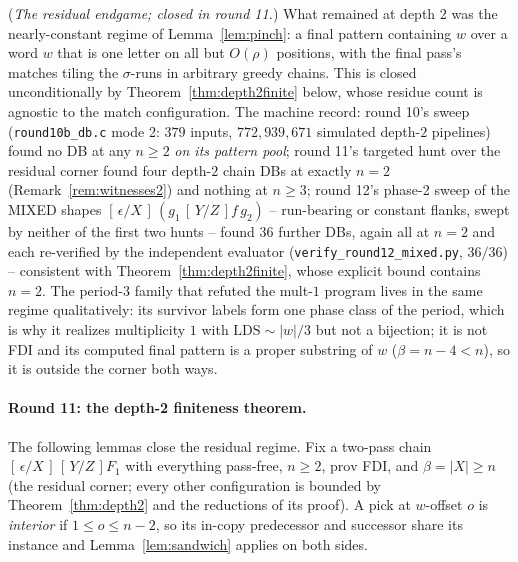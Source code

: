 \begin{remark}
    \label{rem:residual}
    (\emph{The residual endgame; closed in round 11.})  What remained
    at depth $2$ was the nearly-constant regime of
    Lemma~\ref{lem:pinch}: a final pattern containing $w$ over a word
    $w$ that is one letter on all but $O(\rho)$ positions, with the
    final pass's matches tiling the $\sigma$-runs in arbitrary greedy
    chains.  This is closed unconditionally by
    Theorem~\ref{thm:depth2finite} below, whose residue count is
    agnostic to the match configuration.  The machine record:
    round 10's sweep (\texttt{round10b\_db.c} mode 2: $379$ inputs,
    $772{,}939{,}671$ simulated depth-$2$ pipelines) found no DB at
    any $n \geq 2$ \emph{on its pattern pool}; round 11's targeted
    hunt over the residual corner found four depth-$2$ chain DBs at
    exactly $n = 2$ (Remark~\ref{rem:witnesses2}) and nothing at
    $n \geq 3$; round 12's phase-2 sweep of the MIXED shapes
    $[\,\epsilon/X\,]\,(g_1\,[\,Y/Z\,]f\,g_2)$ -- run-bearing or
    constant flanks, swept by neither of the first two hunts --
    found $36$ further DBs, again all at $n = 2$ and each re-verified
    by the independent evaluator (\texttt{verify\_round12\_mixed.py},
    $36/36$) -- consistent with Theorem~\ref{thm:depth2finite},
    whose explicit bound contains $n = 2$.  The period-$3$ family
    that refuted the mult-$1$ program lives in the same regime
    qualitatively: its survivor labels form one phase class of the
    period, which is why it realizes multiplicity $1$ with
    $\mathrm{LDS} \sim |w|/3$ but not a bijection; it is not FDI
    and its computed final pattern is a proper substring of $w$
    ($\beta = n - 4 < n$), so it is outside the corner both ways.
\end{remark}

\paragraph{Round 11: the depth-2 finiteness theorem.}
The following lemmas close the residual regime.  Fix a two-pass chain
$[\,\epsilon/X\,]\,[\,Y/Z\,]F_1$ with everything pass-free, $n \geq 2$,
$\mathrm{prov}$ FDI, and $\beta = |X| \geq n$ (the residual corner;
every other configuration is bounded by
Theorem~\ref{thm:depth2} and the reductions of its proof).  A pick at
$w$-offset $o$ is \emph{interior} if $1 \leq o \leq n - 2$, so its
in-copy predecessor and successor share its instance and
Lemma~\ref{lem:sandwich} applies on both sides.


